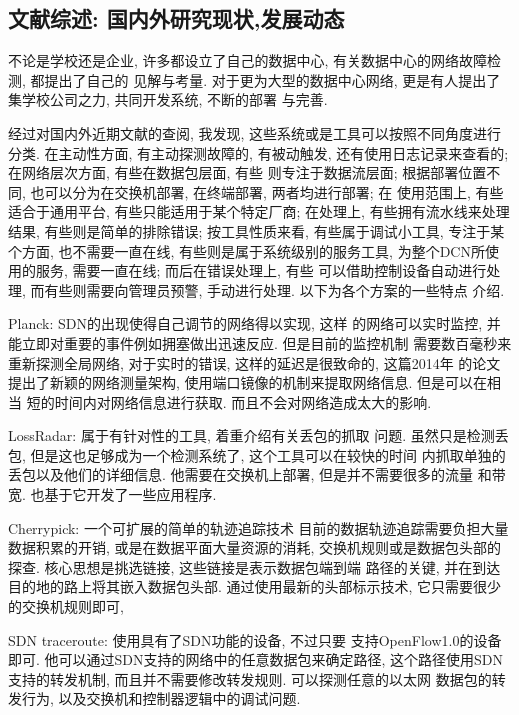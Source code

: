 {\begin{mdframed}[everyline=true]
\section{文献综述: 国内外研究现状,发展动态}

不论是学校还是企业, 许多都设立了自己的数据中心,
有关数据中心的网络故障检测, 都提出了自己的 见解与考量.
对于更为大型的数据中心网络, 更是有人提出了集学校公司之力, 共同开发系统,
不断的部署 与完善.

经过对国内外近期文献的查阅, 我发现,
这些系统或是工具可以按照不同角度进行分类. 在主动性方面,
有主动探测故障的, 有被动触发, 还有使用日志记录来查看的; 在网络层次方面,
有些在数据包层面, 有些 则专注于数据流层面; 根据部署位置不同,
也可以分为在交换机部署, 在终端部署, 两者均进行部署; 在 使用范围上,
有些适合于通用平台, 有些只能适用于某个特定厂商; 在处理上,
有些拥有流水线来处理结果, 有些则是简单的排除错误; 按工具性质来看,
有些属于调试小工具, 专注于某个方面, 也不需要一直在线,
有些则是属于系统级别的服务工具, 为整个DCN所使用的服务, 需要一直在线;
而后在错误处理上, 有些 可以借助控制设备自动进行处理,
而有些则需要向管理员预警, 手动进行处理. 以下为各个方案的一些特点 介绍.

Planck:  SDN的出现使得自己调节的网络得以实现, 这样
的网络可以实时监控, 并能立即对重要的事件例如拥塞做出迅速反应.
但是目前的监控机制 需要数百毫秒来重新探测全局网络, 对于实时的错误,
这样的延迟是很致命的, 这篇2014年 的论文提出了新颖的网络测量架构,
使用端口镜像的机制来提取网络信息. 但是可以在相当
短的时间内对网络信息进行获取. 而且不会对网络造成太大的影响.

LossRadar:  属于有针对性的工具,
着重介绍有关丢包的抓取 问题. 虽然只是检测丢包,
但是这也足够成为一个检测系统了, 这个工具可以在较快的时间
内抓取单独的丢包以及他们的详细信息. 他需要在交换机上部署,
但是并不需要很多的流量 和带宽. 也基于它开发了一些应用程序.

Cherrypick:  一个可扩展的简单的轨迹追踪技术
目前的数据轨迹追踪需要负担大量数据积累的开销,
或是在数据平面大量资源的消耗, 交换机规则或是数据包头部的探查.
核心思想是挑选链接, 这些链接是表示数据包端到端 路径的关键,
并在到达目的地的路上将其嵌入数据包头部. 通过使用最新的头部标示技术,
它只需要很少的交换机规则即可,

SDN traceroute:  使用具有了SDN功能的设备, 不过只要
支持OpenFlow1.0的设备即可.
他可以通过SDN支持的网络中的任意数据包来确定路径,
这个路径使用SDN支持的转发机制, 而且并不需要修改转发规则.
可以探测任意的以太网 数据包的转发行为,
以及交换机和控制器逻辑中的调试问题.


\end{mdframed}}
